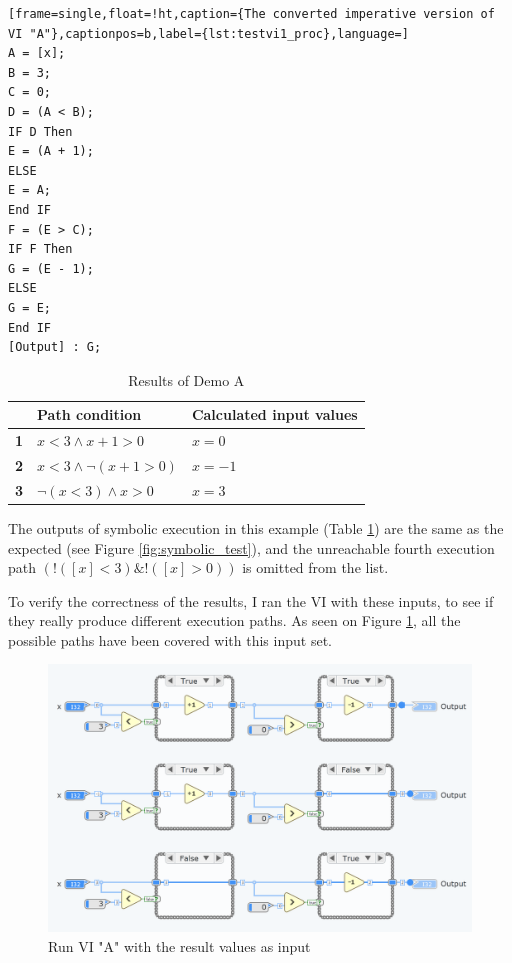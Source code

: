 \begin{lstlisting}[frame=single,float=!ht,caption={The converted imperative version of VI "A"},captionpos=b,label={lst:testvi1_proc},language=]
A = [x]; 
B = 3; 
C = 0; 
D = (A < B); 
IF D Then
E = (A + 1); 
ELSE
E = A; 
End IF
F = (E > C); 
IF F Then
G = (E - 1); 
ELSE
G = E; 
End IF
[Output] : G; 
\end{lstlisting}


\begin{table}[]
\centering

\def\arraystretch{1.5}
\begin{tabular}{|l|l|l|}
\hline
           & \textbf{Path condition}                                         & \textbf{Calculated input values} \\ \hline
\textbf{1} & $x< 3\wedge x+1> 0$ & $x=0$                              \\ \hline
\textbf{2} & $x< 3\wedge \neg (x+1> 0)$ & $x=-1 $                            \\ \hline
\textbf{3} & $\neg(x< 3)\wedge x>0$ & $x=3$                     \\ \hline
\end{tabular}
\caption{Results of Demo A}
  \label{Tab:testvi1resu}
\end{table}
The outputs of symbolic execution in this example (Table \ref{Tab:testvi1resu}) are the same as the expected (see Figure \ref{fig:symbolic_test}), and the unreachable fourth execution path $(!([x] < 3) \& !([x] > 0))$ is omitted from the list.

To verify the correctness of the results, I ran the VI with these inputs, to see if they really produce different execution paths. As seen on Figure \ref{fig:verify1}, all the possible paths have been covered with this input set.
\begin{figure}
\centering
\includegraphics[width=140mm,keepaspectratio]{figures/verify1.png}
\caption{Run VI "A" with the result values as input} 
\label{fig:verify1}
\end{figure}

